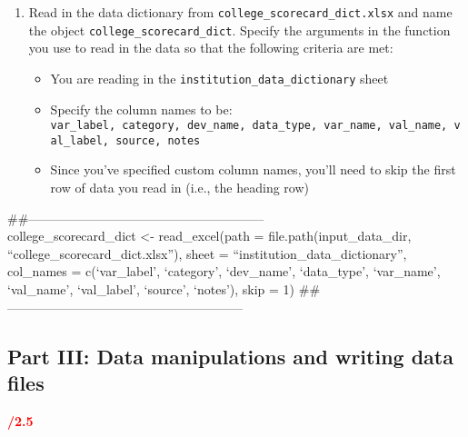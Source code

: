 \documentclass[
]{article}
\providecommand{\tightlist}{%
  \setlength{\itemsep}{0pt}\setlength{\parskip}{0pt}}
\begin{document}
\begin{enumerate}
\def\labelenumi{\arabic{enumi}.}
\setcounter{enumi}{3}
\item
  Read in the data dictionary from
  \texttt{college\_scorecard\_dict.xlsx} and name the object
  \texttt{college\_scorecard\_dict}. Specify the arguments in the
  function you use to read in the data so that the following criteria
  are met:

  \begin{itemize}
  \tightlist
  \item
    You are reading in the \texttt{institution\_data\_dictionary} sheet
  \item
    Specify the column names to be:
    \texttt{\textquotesingle{}var\_label\textquotesingle{},\ \textquotesingle{}category\textquotesingle{},\ \textquotesingle{}dev\_name\textquotesingle{},\ \textquotesingle{}data\_type\textquotesingle{},\ \textquotesingle{}var\_name\textquotesingle{},\ \textquotesingle{}val\_name\textquotesingle{},\ \textquotesingle{}val\_label\textquotesingle{},\ \textquotesingle{}source\textquotesingle{},\ \textquotesingle{}notes\textquotesingle{}}
  \item
    Since you've specified custom column names, you'll need to skip the
    first row of data you read in (i.e., the heading row)
  \end{itemize}
\end{enumerate}

\#\#--------------------------------------------------------\\
college\_scorecard\_dict \textless- read\_excel(path =
file.path(input\_data\_dir, ``college\_scorecard\_dict.xlsx''), sheet =
``institution\_data\_dictionary'', col\_names = c(`var\_label',
`category', `dev\_name', `data\_type', `var\_name', `val\_name',
`val\_label', `source', `notes'), skip = 1)
\#\#--------------------------------------------------------

\hypertarget{part-iii-data-manipulations-and-writing-data-files}{%
\subsection{Part III: Data manipulations and writing data
files}\label{part-iii-data-manipulations-and-writing-data-files}}

\textcolor{red}{\textbf{/2.5}}
\end{document}
